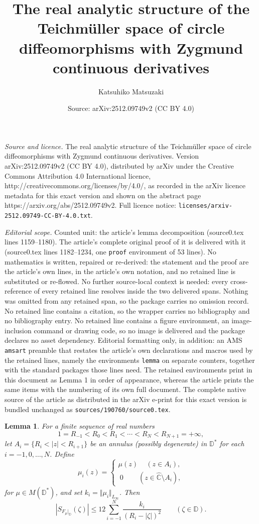 \documentclass[10pt,a4paper]{amsart}
\title{The real analytic structure of the Teichm\"uller space of circle diffeomorphisms with Zygmund continuous derivatives}
\author{Katsuhiko Matsuzaki}
\date{Source: arXiv:2512.09749v2 (CC BY 4.0)}
\newtheorem{lemma}{Lemma}
\begin{document}
\maketitle

\noindent\emph{Source and licence.} The real analytic structure of the Teichm\"uller space of circle diffeomorphisms with Zygmund continuous derivatives. Version arXiv:2512.09749v2 (CC BY 4.0), distributed by arXiv under the Creative Commons Attribution 4.0 International licence, http://creativecommons.org/licenses/by/4.0/, as recorded in the arXiv licence metadata for this exact version and shown on the abstract page https://arxiv.org/abs/2512.09749v2. Full licence notice: \texttt{licenses/arxiv-2512.09749-CC-BY-4.0.txt}.\par\smallskip

\noindent\textit{Editorial scope.} Counted unit: the article's lemma decomposition (source0.tex lines 1159--1180). The article's complete original proof of it is delivered with it (source0.tex lines 1182--1234, one \texttt{proof} environment of 53 lines). No mathematics is written, repaired or re-derived: the statement and the proof are the article's own lines, in the article's own notation, and no retained line is substituted or re-flowed.  No further source-local context is needed: every cross-reference of every retained line resolves inside the two delivered spans.  Nothing was omitted from any retained span, so the package carries no omission record.  No retained line contains a citation, so the wrapper carries no bibliography and no bibliography entry.  No retained line contains a figure environment, an image-inclusion command or drawing code, so no image is delivered and the package declares no asset dependency.  Editorial formatting only, in addition: an AMS \texttt{amsart} preamble that restates the article's own declarations and macros used by the retained lines, namely the environments \texttt{lemma} on separate counters, together with the standard packages those lines need.  The retained environments print in this document as Lemma 1 in order of appearance, whereas the article prints the same items with the numbering of its own full document.  The complete native source of the article as distributed in the arXiv e-print for this exact version is bundled unchanged as \texttt{sources/190760/source0.tex}.
\begin{lemma}\label{decomposition}
For a finite sequence of real numbers
$$
1=R_{-1}<R_0<R_1< \cdots <R_{N}<R_{N+1}=+\infty,
$$
let $A_i=\{R_i < |z| < R_{i+1}\}$ be an annulus (possibly degenerate)
in $\mathbb D^*$ 
for each $i=-1,0,\ldots,N$.  
Define
$$
\mu_i(z)=\left\{
\begin{array}{l} \mu(z) \,\quad (z \in A_i),\\[2pt]
\ 0  \qquad\, (z \in \widehat{\mathbb C} \setminus A_i),
\end{array}
\right.
$$ 
for $\mu \in M(\mathbb D^*)$, and set $k_i=\Vert \mu_i \Vert_{L_\infty}$. Then
$$
|S_{F_\mu|_\mathbb D}(\zeta)| 
\leq 12 \sum_{i=-1}^{N} \frac{k_i}{(R_i-|\zeta|)^2} \qquad (\zeta \in \mathbb D).
$$
\end{lemma}
\end{document}
